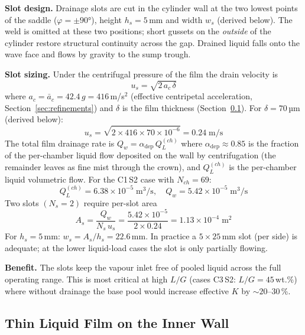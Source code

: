 \documentclass[11pt,letterpaper]{article}
\begin{document}
\textbf{Slot design.}  Drainage slots are cut in the cylinder wall at the two
lowest points of the saddle ($\varphi = \pm 90°$), height $h_s = 5$\,mm and
width $w_s$ (derived below).  The weld is omitted at these two positions;
short gussets on the \emph{outside} of the cylinder restore structural
continuity across the gap.  Drained liquid falls onto the wave face and
flows by gravity to the sump trough.

\textbf{Slot sizing.}  Under the centrifugal pressure of the film the
drain velocity is
\begin{equation}
  u_s = \sqrt{2\,a_c\,\delta}
  \label{eq:uslot}
\end{equation}
where $a_c = \bar{a}_c = 42.4\,g = 416$\,m/s$^2$ (effective centripetal
acceleration, Section~\ref{sec:refinements}) and $\delta$ is the film
thickness (Section~\ref{sec:film_thickness}).  For $\delta = 70$\,µm
(derived below):
\[
  u_s = \sqrt{2 \times 416 \times 70 \times 10^{-6}} = 0.24\;\text{m/s}
\]
The total film drainage rate is $Q_w = \alpha_{\mathrm{dep}}\,Q_L^{(ch)}$
where $\alpha_{\mathrm{dep}} \approx 0.85$ is the fraction of the per-chamber
liquid flow deposited on the wall by centrifugation (the remainder leaves as
fine mist through the crown), and $Q_L^{(ch)}$ is the per-chamber liquid
volumetric flow.  For the C1\,S2 case with $N_{ch} = 69$:
\[
  Q_L^{(ch)} = 6.38 \times 10^{-5}\;\text{m}^3\text{/s},\quad
  Q_w = 5.42 \times 10^{-5}\;\text{m}^3\text{/s}
\]
Two slots $(N_s = 2)$ require per-slot area
\[
  A_s = \frac{Q_w}{N_s\,u_s} = \frac{5.42 \times 10^{-5}}{2 \times 0.24}
       = 1.13 \times 10^{-4}\;\text{m}^2
\]
For $h_s = 5$\,mm: $w_s = A_s/h_s = 22.6$\,mm.  In practice a
$5 \times 25$\,mm slot (per side) is adequate; at the lower liquid-load
cases the slot is only partially flowing.

\textbf{Benefit.}  The slots keep the vapour inlet free of pooled liquid
across the full operating range.  This is most critical at high $L/G$
(cases C3\,S2: $L/G = 45$\,wt.\%) where without drainage the base pool
would increase effective $K$ by $\sim 20$--$30$\,\%.

\subsection{Thin Liquid Film on the Inner Wall}
\label{sec:film_thickness}
\end{document}
